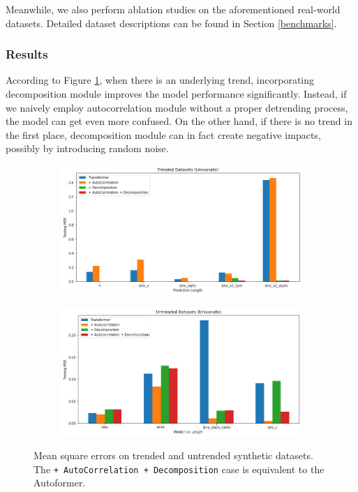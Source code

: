 Meanwhile, we also perform ablation studies on the aforementioned real-world datasets. Detailed dataset descriptions can be found in Section \ref{benchmarks}. 

\subsubsection{Results}

According to Figure \ref{fig:trended_mse}, when there is an underlying trend, incorporating decomposition module improves the model performance significantly. 
Instead, if we naively employ autocorrelation module without a proper detrending process, the model can get even more confused. 
On the other hand, if there is no trend in the first place, decomposition module can in fact create negative impacts, possibly by introducing random noise. 

\begin{figure}
    \centering
    \begin{subfigure}{0.6\textwidth}
        \includegraphics[width=\textwidth]{img/mse_trended.png}
    \end{subfigure}
    \begin{subfigure}{0.6\textwidth}
        \includegraphics[width=\textwidth]{img/mse_untrended.png}
    \end{subfigure}
    \caption{Mean square errors on trended and untrended synthetic datasets. The \texttt{+ AutoCorrelation + Decomposition} case is equivalent to the Autoformer.}
    \label{fig:trended_mse}
\end{figure}

